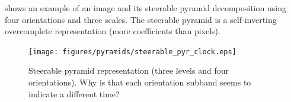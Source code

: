 \Fig{\ref{fig:steerable_pyr_clock}} shows an example of an image and its steerable pyramid decomposition using four orientations and three scales.
The steerable pyramid is a self-inverting overcomplete representation (more coefficients than pixels).

\begin{figure}[h!]
\centerline{
\texttt{[image: figures/pyramids/steerable\_pyr\_clock.eps]}
}
\caption{Steerable pyramid representation (three levels and four orientations). Why is that each orientation subband seems to indicate a different time?}
\label{fig:steerable_pyr_clock}
\end{figure}


%
%




